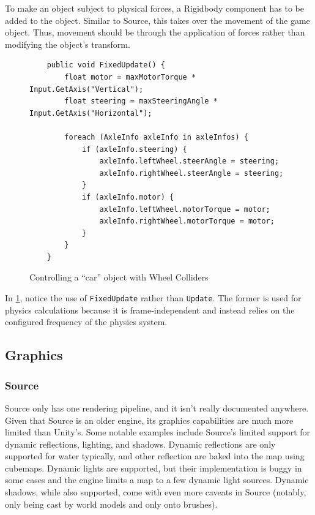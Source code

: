 \documentclass[a4paper, 12pt]{scrartcl}
\begin{document}
To make an object subject to physical forces, a Rigidbody component has to be added to the object. Similar to Source, this takes over the movement of the game object. Thus, movement should be through the application of forces rather than modifying the object's transform.

\begin{figure}[!htb]
  \begin{verbatim}
    public void FixedUpdate() {
        float motor = maxMotorTorque * Input.GetAxis("Vertical");
        float steering = maxSteeringAngle * Input.GetAxis("Horizontal");

        foreach (AxleInfo axleInfo in axleInfos) {
            if (axleInfo.steering) {
                axleInfo.leftWheel.steerAngle = steering;
                axleInfo.rightWheel.steerAngle = steering;
            }
            if (axleInfo.motor) {
                axleInfo.leftWheel.motorTorque = motor;
                axleInfo.rightWheel.motorTorque = motor;
            }
        }
    }
  \end{verbatim}
  \caption{Controlling a ``car'' object with Wheel Colliders}
  \label{fig:unity_wheels}
\end{figure}

In \cref{fig:unity_wheels}, notice the use of \texttt{FixedUpdate} rather than \texttt{Update}. The former is used for physics calculations because it is frame-independent and instead relies on the configured frequency of the physics system.

\subsection{Graphics}
\subsubsection{Source}
Source only has one rendering pipeline, and it isn't really documented anywhere. Given that Source is an older engine, its graphics capabilities are much more limited than Unity's. Some notable examples include Source's limited support for dynamic reflections, lighting, and shadows. Dynamic reflections are only supported for water typically, and other reflection are baked into the map using cubemaps. Dynamic lights are supported, but their implementation is buggy in some cases and the engine limits a map to a few dynamic light sources. Dynamic shadows, while also supported, come with even more caveats in Source (notably, only being cast by world models and only onto brushes).
\end{document}

